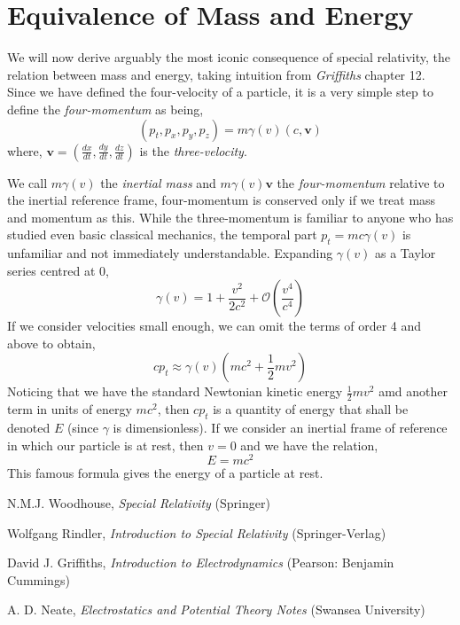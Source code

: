 \documentclass[a4paper,12pt,draft]{report}
\begin{document}
\section{Equivalence of Mass and Energy}

We will now derive arguably the most iconic consequence of special relativity, the relation between mass and energy, taking intuition from \emph{Griffiths} \cite{DJG} chapter 12. Since we have defined the four-velocity of a particle, it is a very simple step to define the \emph{four-momentum} as being,
$$
(p_t, p_x, p_y, p_z) = m\gamma(v)\left(c, \mathbf{v}\right)
$$
where, $\mathbf{v} = \left(\frac{dx}{dt}, \frac{dy}{dt}, \frac{dz}{dt}\right)$ is the \emph{three-velocity}.

We call $m\gamma(v)$ the \emph{inertial mass} and $m\gamma(v)\mathbf{v}$ the \emph{four-momentum} relative to the inertial reference frame, four-momentum is conserved only if we treat mass and momentum as this. While the three-momentum is familiar to anyone who has studied even basic classical mechanics, the temporal part $p_t = mc\gamma(v)$ is unfamiliar and not immediately understandable. Expanding $\gamma(v)$ as a Taylor series centred at 0,
$$
\gamma(v) = 1 + \frac{v^2}{2c^2} + \mathcal{O}\left(\frac{v^4}{c^4}\right)
$$
If we consider velocities small enough, we can omit the terms of order 4 and above to obtain,
$$
cp_t \approx \gamma(v)\left(mc^2 + \frac{1}{2}mv^2\right)
$$
Noticing that we have the standard Newtonian kinetic energy $\frac{1}{2}mv^2$ amd another term in units of energy $mc^2$, then $cp_t$ is a quantity of energy that shall be denoted $E$ (since $\gamma$ is dimensionless). If we consider an inertial frame of reference in which our particle is at rest, then $v = 0$ and we have the relation,
$$
E = mc^2
$$
This famous formula gives the energy of a particle at rest.


\begin{thebibliography}{99}

 N.M.J. Woodhouse, \emph{Special Relativity} (Springer)

 Wolfgang Rindler, \emph{Introduction to Special Relativity} (Springer-Verlag)

 David J. Griffiths, \emph{Introduction to Electrodynamics} (Pearson: Benjamin Cummings)

 A. D. Neate, \emph{Electrostatics and Potential Theory Notes} (Swansea University)

\end{thebibliography}
\end{document}
